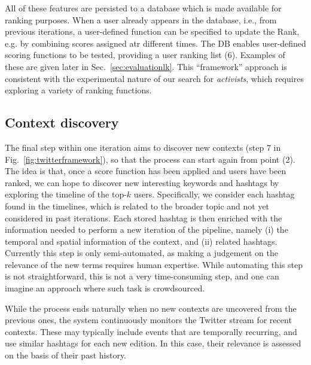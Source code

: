 All of these features are persisted to a database which is made available for ranking purposes.
When a user already appears in the database, i.e., from previous iterations, a user-defined function can be specified to update the Rank, e.g. by combining scores assigned atr different times.
%
The DB enables user-defined scoring functions to be tested, providing a user ranking list (6). Examples of these are given later in Sec.~\ref{sec:evaluationlk}.
This ``framework'' approach is consistent with the experimental nature of our search for \textit{activists}, which requires exploring a variety of ranking functions.

\subsection{Context discovery} \label{sec:context-discovery}

The final step within one iteration aims to discover new contexts (step 7 in Fig.~\ref{fig:twitterframework}), so that the process can start again from point (2).
The idea is that, once a score function has been applied and users have been ranked, we can hope to discover new interesting keywords and hashtags by exploring the timeline of the top-$k$ users.
Specifically,  we consider each hashtag found in the timelines, which is related to the broader topic and not yet considered in past iterations.
Each stored hashtag is then enriched with the information needed to perform a new iteration of the pipeline, namely (i) the temporal and spatial information of the context, and (ii) related hashtags.
%
Currently this step is only semi-automated, as making a judgement on the relevance of the new terms requires  human expertise.
While automating this step is not straightforward, this is not a very time-consuming step, and one can imagine an approach where such task is crowdsourced.

While the process ends naturally when no new contexts are uncovered from the previous ones, the system continuously monitors the Twitter stream for recent contexts. These may typically include events that are temporally recurring, and use similar hashtags for each new edition. In this case, their relevance is assessed on the basis of their past history.